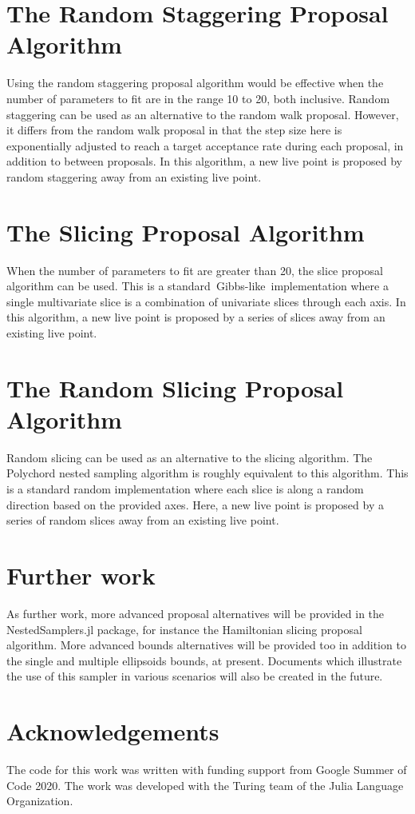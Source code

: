 \documentclass{juliacon}
\begin{document}
\section{The Random Staggering Proposal Algorithm}

Using the random staggering proposal algorithm would be effective when the number of parameters to fit are in the range 10 to 20, both inclusive. Random staggering can be used as an alternative to the random walk proposal. However, it differs from the random walk proposal in that the step size here is exponentially adjusted to reach a target acceptance rate during each proposal, in addition to between proposals. In this algorithm, a new live point is proposed by random staggering away from an existing live point.

\section{The Slicing Proposal Algorithm}

When the number of parameters to fit are greater than 20, the slice proposal algorithm can be used. This is a standard Gibbs-like implementation where a single multivariate slice is a combination of univariate slices through each axis. In this algorithm, a new live point is proposed by a series of slices away from an existing live point. 

\section{The Random Slicing Proposal Algorithm}

Random slicing can be used as an alternative to the slicing algorithm. The Polychord nested sampling algorithm is roughly equivalent to this algorithm. This is a standard random implementation where each slice is along a random direction based on the provided axes. Here, a new live point is proposed by a series of random slices away from an existing live point. 

\section{Further work}

As further work, more advanced proposal alternatives will be provided in the NestedSamplers.jl package, for instance the Hamiltonian slicing proposal algorithm. More advanced bounds alternatives will be provided too in addition to the single and multiple ellipsoids bounds, at present. Documents which illustrate the use of this sampler in various scenarios will also be created in the future.

\section*{Acknowledgements}
The code for this work was written with funding support from Google Summer of Code 2020. The work was developed with the Turing team of the Julia Language Organization.




\end{document}
